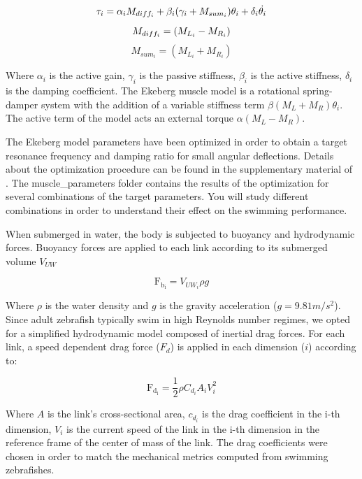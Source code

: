 \documentclass{cmc}
\begin{document}
  \[
	\tau_i = \alpha_i M_{diff_i} + \beta_i(\gamma_i +M_{sum_i} )\theta_i + \delta_i \Dot{\theta_i} \\
  \]
  \[
    M_{diff_i} = (M_{L_i} - M_{R_i}) \\
  \]
  \[
    M_{sum_i} = (M_{L_i} + M_{R_i})
  \]

Where $\alpha_i$ is the active gain, $\gamma_i$ is the passive stiffness, $\beta_i$ is the active stiffness, $\delta_i$ is the damping coefficient. The Ekeberg muscle model is a rotational spring-damper system with the addition of a variable stiffness term $\beta (M_L+M_R) \theta_i$. The active term of the model acts an external torque $\alpha(M_L-M_R)$.

The Ekeberg model parameters have been optimized in order to obtain a target resonance frequency and damping ratio for small angular deflections. Details about the optimization procedure can be found in the supplementary material of \cite{pazzaglia2025balancing}.
The muscle\_parameters folder contains the results of the optimization for several combinations of the target parameters. You will study different combinations in order to understand their effect on the swimming performance.

When submerged in water, the body is subjected to buoyancy and hydrodynamic forces. Buoyancy forces are applied to each link according to its submerged volume $V_{UW}$

  \[
	\mathrm{F_{b_i}} = V_{UW_i} \rho g
  \]

Where $\rho$ is the water density and $g$ is the gravity acceleration ($g = 9.81 m/s^2$).
Since adult zebrafish typically swim in high Reynolds number regimes, we opted for a simplified hydrodynamic model composed of inertial drag forces. For each link, a speed dependent drag force ($F_d$) is applied in each dimension ($i$) according to:

  \[
	\mathrm{F_{d_i}} = \frac{1}{2} \rho C_{d_i} A_{i} V_{i}^2
  \]

Where $A$ is the link's cross-sectional area, $c_{d_i}$ is the drag coefficient in the i-th dimension, $V_{i}$ is the current speed of the link in the i-th dimension in the reference frame of the center of mass of the link. The drag coefficients were chosen in order to match the mechanical metrics computed from swimming zebrafishes.
\end{document}
